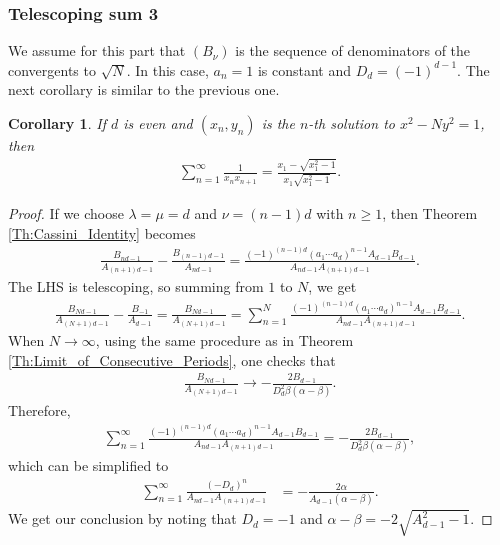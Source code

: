 \documentclass[12pt]{article}
\theoremstyle{plain}
\newtheorem{corollary}[theorem]{Corollary}
\theoremstyle{definition}
\theoremstyle{remark}
\begin{document}
\subsubsection{Telescoping sum 3}

We assume for this part	that $ (B_\nu) $ is the sequence of denominators of the convergents to $ \sqrt{N} $. In this case, $ a_n = 1 $ is constant and $ D_d = (-1)^{d - 1} $. The next corollary is similar to the previous one.
\begin{corollary} If $ d $ is even and $ (x_n, y_n) $ is the $ n $-th solution to $ x^2 - Ny^2 = 1 $, then
\begin{align*}
	\sum_{n = 1}^\infty \frac{1}{x_n x_{n + 1}} = \frac{x_1 - \sqrt{x_1^2 - 1}}{x_1 \sqrt{x_1^2 - 1}}.
\end{align*}
\end{corollary}

\begin{proof} If we choose  $ \lambda = \mu = d $ and $ \nu = (n - 1)d $ with $ n \geq 1 $, then Theorem \ref{Th:Cassini_Identity} becomes
\begin{align*}	
	\frac{B_{nd - 1}}{A_{(n + 1)d - 1}} - \frac{B_{(n - 1)d - 1}}{A_{nd - 1}} = \frac{(-1)^{(n - 1)d} (a_1 \cdots a_d)^{n - 1} A_{d - 1} B_{d - 1}}{A_{nd - 1} A_{(n + 1)d - 1}}.
\end{align*}
The LHS is telescoping, so summing from $ 1 $ to $ N $, we get
\begin{align*}
	\frac{B_{Nd - 1}}{A_{(N + 1)d - 1}} - \frac{B_{-1}}{A_{d - 1}} = \frac{B_{Nd - 1}}{A_{(N + 1)d - 1}} = \sum_{n = 1}^N \frac{(-1)^{(n - 1)d} (a_1 \cdots a_d)^{n - 1} A_{d - 1} B_{d - 1}}{A_{nd - 1} A_{(n + 1)d - 1}}.
\end{align*}
When $ N \longrightarrow \infty $, using the same procedure as in Theorem  \ref{Th:Limit_of_Consecutive_Periods}, one checks that
\begin{align*}
	\frac{B_{Nd - 1}}{A_{(N + 1)d - 1}} \rightarrow -\frac{2B_{d - 1}}{D_d^2 \beta (\alpha - \beta)}.
\end{align*}
Therefore,
\begin{align*}
	\sum_{n = 1}^\infty \frac{(-1)^{(n - 1)d} (a_1 \cdots a_d)^{n - 1} A_{d - 1} B_{d - 1}}{A_{nd - 1} A_{(n + 1)d - 1}} = -\frac{2B_{d - 1}}{D_d^2 \beta (\alpha - \beta)},
\end{align*}
which can be simplified to 
\begin{align*}
	\sum_{n = 1}^\infty \frac{(-D_d)^n}{A_{nd - 1} A_{(n + 1)d - 1}} &= -\frac{2\alpha}{A_{d - 1} (\alpha - \beta)}.
\end{align*}
We get our conclusion by noting that $ D_d = -1 $ and $ \alpha - \beta = -2\sqrt{A_{d - 1}^2 - 1} $.
\end{proof}
\end{document}
